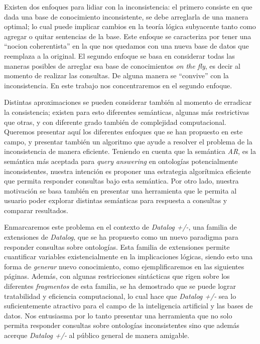 \documentclass[11pt,a4paper,twoside]{tesis}
\begin{document}
Existen dos enfoques para lidiar con la inconsistencia: el primero consiste en que dada una base de conocimiento inconsistente, se debe arreglarla de una manera optimal;  lo cual puede implicar cambios en la teoría lógica subyacente tanto como agregar o quitar sentencias de la base. Este enfoque se caracteriza por tener una ``nocion coherentista'' en la que nos quedamos con una nueva base de datos que reemplaza a la original.  
El segundo enfoque se basa en considerar todas las maneras posibles de arreglar esa base de conocimientos \textit{on the fly}, es decir al momento de realizar las consultas. De alguna manera se ``convive'' con la inconsistencia. En este trabajo nos concentraremos en el segundo enfoque.

Distintas aproximaciones se pueden considerar también al momento de erradicar la consistencia; existen para esto diferentes semánticas, algunas más restrictivas que otras, y con diferente grado también de complejidad computacional. Queremos presentar aquí los diferentes enfoques que se han propuesto en este campo, y presentar también un algoritmo que ayude a resolver el problema de la inconsistencia de manera eficiente. Teniendo en cuenta que la semántica \textit{AR}, es la semántica más aceptada para \textit{query answering} en ontologías potencialmente inconsistentes, nuestra intención es proponer una estrategia algorítmica eficiente que permita responder consultas bajo esta semántica.
Por otro lado, nuestra motivación se basa también en presentar una herramienta que le permita al usuario poder explorar distintas semánticas para respuesta a consultas y comparar resultados.

Enmarcaremos este problema en el contexto de \textit{Datalog +/-}, una familia de extensiones de \textit{Datalog}, que se ha propuesto como un nuevo paradigma para responder consultas sobre ontologías. Esta familia de extensiones permite cuantificar variables existencialmente en la implicaciones lógicas, siendo esto una forma de \textit{generar} nuevo conocimiento, como ejemplificaremos en las siguientes páginas. Además, con algunas restricciones sintácticas que rigen sobre los diferentes \textit{fragmentos} de esta familia, se ha demostrado que se puede lograr tratabilidad y eficiencia computacional, lo cual hace que \textit{Datalog +/-} sea lo suficientemente atractivo para el campo de la inteligencia artificial y las bases de datos. Nos entusiasma por lo tanto presentar una herramienta que no solo permita responder consultas sobre ontologías inconsistentes sino que además acerque \textit{Datalog +/-} al público general de manera amigable. 
\end{document}
